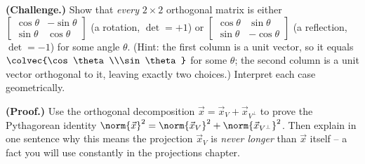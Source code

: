 \begin{exercise}\label{ch17:ex-challenge-rotation}
\textbf{(Challenge.)} Show that \emph{every} $2\times2$ orthogonal matrix is either
$\begin{bmatrix}\cos\theta&-\sin\theta\\\sin\theta&\cos\theta\end{bmatrix}$ (a rotation, $\det=+1$)
or $\begin{bmatrix}\cos\theta&\sin\theta\\\sin\theta&-\cos\theta\end{bmatrix}$ (a reflection,
$\det=-1$) for some angle $\theta$. (Hint: the first column is a unit vector, so it equals
$\colvec{\cos\theta\\\sin\theta}$ for some $\theta$; the second column is a unit vector orthogonal
to it, leaving exactly two choices.) Interpret each case geometrically.
\end{exercise}

\begin{exercise}\label{ch17:ex-proof-distance}
\textbf{(Proof.)} Use the orthogonal decomposition $\vec x=\vec x_V+\vec x_{V^\perp}$ to prove the
Pythagorean identity $\norm{\vec x}^2=\norm{\vec x_V}^2+\norm{\vec x_{V^\perp}}^2$. Then explain in
one sentence why this means the projection $\vec x_V$ is \emph{never longer} than $\vec x$ itself --
a fact you will use constantly in the projections chapter.
\end{exercise}
